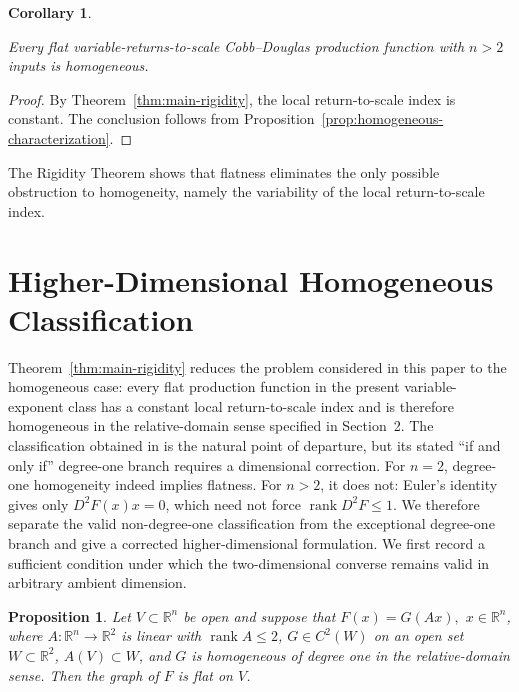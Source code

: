 \documentclass[12pt]{amsart}
\newtheorem{proposition}{Proposition}[section]
\newtheorem{corollary}{Corollary}[section]
\begin{document}
\begin{corollary}
\label{cor:homogeneity}

Every flat variable-returns-to-scale Cobb--Douglas production function
with $n>2$ inputs is homogeneous.

\end{corollary}

\begin{proof}

By Theorem~\ref{thm:main-rigidity}, the local return-to-scale index is
constant. The conclusion follows from
Proposition~\ref{prop:homogeneous-characterization}.

\end{proof}

The Rigidity Theorem shows that flatness eliminates the only
possible obstruction to homogeneity, namely the variability of the local
return-to-scale index.






\section{Higher-Dimensional Homogeneous Classification}
\label{sec:classification}

Theorem~\ref{thm:main-rigidity} reduces the problem considered in this
paper to the homogeneous case: every flat production function
in the present variable-exponent class has a constant local return-to-scale
index and is therefore homogeneous in the relative-domain sense specified
in Section~2. The classification obtained in \cite{CV2013} is the
natural point of departure, but its stated ``if and only if'' degree-one
branch requires a dimensional correction.
For \(n=2\), degree-one
homogeneity indeed implies flatness. For \(n>2\), it does not:
Euler's identity gives only \(D^2F(x)x=0\), which need not force
\(\operatorname{rank}D^2F\le1\). We therefore separate the valid
non-degree-one classification from the exceptional degree-one branch and
give a corrected higher-dimensional formulation. We first record a
sufficient condition under which the two-dimensional converse remains
valid in arbitrary ambient dimension.

\begin{proposition}\label{prop:effective-two}
Let $V\subset\mathbb R^n$ be open and suppose that
\(
 F(x)=G(Ax),
\)
$x\in\mathbb R^n$,
where $A:\mathbb R^n\to\mathbb R^2$ is linear with $\operatorname{rank}A\le2$, $G\in C^2(W)$ on an open set $W\subset\mathbb R^2$, $A(V)\subset W$, and $G$ is homogeneous of degree one in the relative-domain sense. Then the graph of $F$ is flat on $V$.
\end{proposition}
\end{document}

